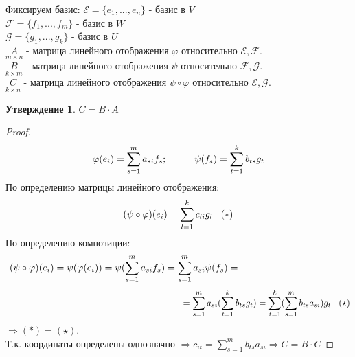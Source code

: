 \documentclass[a4paper, 12pt]{article}
\renewcommand{\phi}{\varphi}
\newcommand\tab[1][.5cm]{\hspace*{#1}}
\theoremstyle{definition}
\newtheorem*{subtheorem}{Утверждение}
\begin{document}
\begin{itemize}
    Фиксируем базис: \tab[0.3cm]$\mathcal{E} = \{e_1,...,e_n\}$ - базис в $V$ \\
    \tab[4.3cm]$\mathcal{F} = \{f_1,...,f_m\}$ - базис в $W$ \\
    \tab[4.3cm]$\mathcal{G} = \{g_1,...,g_k\}$ - базис в $U$ \\
    $\underset{m \times n}{A}$ - матрица линейного отображения $\phi$ относительно $\mathcal{E}, \mathcal{F}$. \\
    $\underset{k \times m}{B}$ - матрица линейного отображения $\psi$ относительно $\mathcal{F}, \mathcal{G}$. \\
    $\underset{k \times n}{C}$ - матрица линейного отображения $\psi \circ \phi$ относительно $\mathcal{E}, \mathcal{G}$.
    \begin{subtheorem}
      $C = B \cdot A$ 
    \end{subtheorem} 
    \begin{proof}
      $$\phi(e_i) = \sum \limits_{s=1}^ma_{si}f_s; \tab[1cm]\psi(f_s) = \sum \limits_{t=1}^kb_{ts}g_t$$
      По определению матрицы линейного отображения:
      $$(\psi \circ \phi)(e_i) = \sum \limits_{l=1}^kc_{li}g_l \tab[0.3cm](\ast)$$ 
      По определению композиции:
      $$(\psi \circ \phi)(e_i) = \psi(\phi(e_i)) = \psi(\sum \limits_{s=1}^ma_{si}f_s) = \sum \limits_{s=1}^ma_{si}\psi(f_s) =\tab[4cm]$$ $$\tab[7cm]= \sum \limits_{s=1}^ma_{si}(\sum \limits_{t=1}^kb_{ts}g_t) = \sum \limits_{t=1}^k(\sum \limits_{s=1}^mb_{ts}a_{si})g_t \tab[0.3cm](\star)$$
      $\Longrightarrow $$(\ast) = (\star)$.\\
      Т.к. координаты определены однозначно $\Rightarrow c_{it} = \sum \limits_{s=1}^mb_{ts}a_{si} \Rightarrow C =B \cdot C$  
    \end{proof} 
  \end{itemize}
\end{document}
